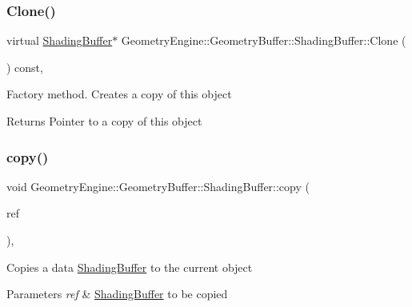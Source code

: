 \subsubsection{\texorpdfstring{Clone()}{Clone()}}
{\footnotesize\ttfamily virtual \mbox{\hyperlink{class_geometry_engine_1_1_geometry_buffer_1_1_shading_buffer}{Shading\+Buffer}}$\ast$ Geometry\+Engine\+::\+Geometry\+Buffer\+::\+Shading\+Buffer\+::\+Clone (\begin{DoxyParamCaption}{ }\end{DoxyParamCaption}) const\hspace{0.3cm}{\ttfamily [inline]}, {\ttfamily [virtual]}}

Factory method. Creates a copy of this object \begin{DoxyReturn}{Returns}
Pointer to a copy of this object 
\end{DoxyReturn}
\mbox{\label{class_geometry_engine_1_1_geometry_buffer_1_1_shading_buffer_ac729c279a19db3d12a5be39aff5e2df1}} 
\subsubsection{\texorpdfstring{copy()}{copy()}}
{\footnotesize\ttfamily void Geometry\+Engine\+::\+Geometry\+Buffer\+::\+Shading\+Buffer\+::copy (\begin{DoxyParamCaption}\item[{const \mbox{\hyperlink{class_geometry_engine_1_1_geometry_buffer_1_1_shading_buffer}{Shading\+Buffer}} \&}]{ref }\end{DoxyParamCaption})\hspace{0.3cm}{\ttfamily [protected]}, {\ttfamily [virtual]}}

Copies a data \mbox{\hyperlink{class_geometry_engine_1_1_geometry_buffer_1_1_shading_buffer}{Shading\+Buffer}} to the current object 
\begin{DoxyParams}{Parameters}
{\em ref} & \mbox{\hyperlink{class_geometry_engine_1_1_geometry_buffer_1_1_shading_buffer}{Shading\+Buffer}} to be copied \\
\hline
\end{DoxyParams}
\mbox{\label{class_geometry_engine_1_1_geometry_buffer_1_1_shading_buffer_a572f4e882695cc97ec4cba7946093d52}} 
